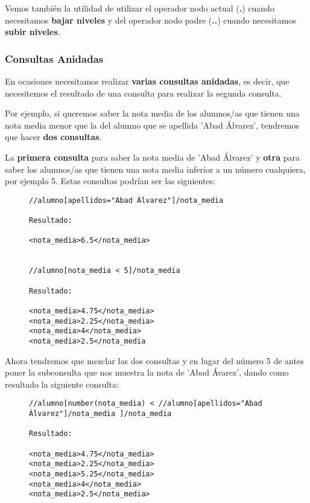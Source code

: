     Vemos también la utilidad de utilizar el operador nodo actual (\textbf{.}) cuando necesitamos \textbf{bajar niveles} y del operador nodo padre (\textbf{..}) cuando necesitamos \textbf{subir niveles}.

\subsubsection{Consultas Anidadas}
En ocasiones necesitamos realizar \textbf{varias consultas anidadas}, es decir, que necesitemos el resultado de una consulta para realizar la segunda consulta.

Por ejemplo, si queremos saber la nota media de los alumnos/as que tienen una nota media menor que la del alumno que se apellida 'Abad Álvarez', tendremos que hacer \textbf{dos consultas}.

La \textbf{primera consulta} para saber la nota media de 'Abad Álvarez' y \textbf{otra} para saber los alumnos/as que tienen una nota media inferior a un número cualquiera, por ejemplo 5. Estas consultas podrían ser las siguientes:

\begin{figure}[H]
    \begin{tcolorbox}[sharp corners, colback=yellow!30, colframe=white!20]
        \scriptsize
\begin{verbatim}
//alumno[apellidos="Abad Álvarez"]/nota_media

Resultado:

<nota_media>6.5</nota_media>


//alumno[nota_media < 5]/nota_media

Resultado:

<nota_media>4.75</nota_media>
<nota_media>2.25</nota_media>
<nota_media>4</nota_media>
<nota_media>2.5</nota_media
\end{verbatim}
    \end{tcolorbox}
\end{figure}

Ahora tendremos que mezclar las dos consultas y en lugar del número 5 de antes poner la subconsulta que nos muestra la nota de 'Abad Ávarez', dando como resultado la siguiente consulta:

\begin{figure}[H]
    \begin{tcolorbox}[sharp corners, colback=yellow!30, colframe=white!20]
        \scriptsize
        \begin{verbatim}
//alumno[number(nota_media) < //alumno[apellidos="Abad Álvarez"]/nota_media ]/nota_media

Resultado:

<nota_media>4.75</nota_media>
<nota_media>2.25</nota_media>
<nota_media>5.25</nota_media>
<nota_media>4</nota_media>
<nota_media>2.5</nota_media>
        \end{verbatim}
    \end{tcolorbox}
\end{figure}

